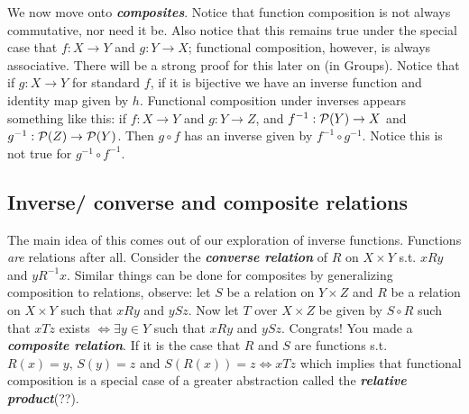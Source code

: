 \documentclass{report}
\begin{document}
We now move onto \textbf{\textit{composites}}. 
Notice that function composition is not always commutative, nor need it be. Also notice that this remains true under the special case that \( f :X \to Y \) and \( g : Y \to X \); functional composition, however, is always associative. There will be a strong proof for this later on (in Groups). Notice that if \( g : X\to Y \) for standard \( f \), if it is bijective we have an inverse function and identity map given by \( h \). Functional composition under inverses appears something like this: if \( f :X \to  Y \) and \( g: Y\to Z \), and \( f^{-1} : \mathcal{P}(Y) \to X\) and \( g^{-1} : \mathcal{P}(Z) \to \mathcal{P}(Y) \). Then \(g \circ f \) has an inverse given by \( f^{-1}\circ g^{-1} \). Notice this is not true for \( g^{-1}\circ f^{-1} \).


\subsection{Inverse/ converse and composite relations}

The main idea of this comes out of our exploration of inverse functions. Functions \textit{are} relations after all. Consider the \textbf{\textit{converse relation}} of \( R \) on \( X \times Y \) s.t. \( xRy \) and \( yR^{-1}x \). Similar things can be done for composites by generalizing composition to relations, observe: let \( S \) be a relation on \( Y \times Z \) and \( R \) be a relation on \( X \times Y \) such that \( xRy \) and \( ySz \). Now let \( T \) over \( X\times Z \) be given by \( S\circ R \) such that \( xTz \) exists \( \iff  \exists  y \in Y\) such that \( xRy \) and \( ySz \). Congrats! You made a \textbf{\textit{composite relation}}. If it is the case that \( R \) and \( S \) are functions s.t. \( R(x)=y, \, S(y)=z \) and \( S(R(x))=z \iff xTz \) which implies that functional composition is a special case of a greater abstraction called the \textbf{\textit{relative product}}(??).


\end{document}
